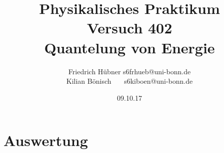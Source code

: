 \documentclass{article}
\newcommand{\RM}[1]{\MakeUppercase{\romannumeral #1}}
\begin{document}
\setlength{\parindent}{0em}   %
\title{Physikalisches Praktikum \RM{4}\\Versuch 402\\Quantelung von Energie}
\author{Friedrich Hübner \qquad s6frhueb@uni-bonn.de \\
  Kilian Bönisch \ \ \ \qquad s6kiboen@uni-bonn.de }
\date{09.10.17}

\maketitle

\thispagestyle{empty}

\newpage







\section{Auswertung}



\printbibliography
\end{document}
